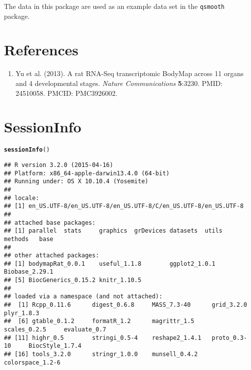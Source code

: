 \documentclass{article}\usepackage[]{graphicx}\usepackage[usenames,dvipsnames]{color}
\makeatletter
\newcommand{\hlstd}[1]{\textcolor[rgb]{0.345,0.345,0.345}{#1}}%
\newcommand{\hlkwd}[1]{\textcolor[rgb]{0.737,0.353,0.396}{\textbf{#1}}}%
\newenvironment{kframe}{%
 \def\at@end@of@kframe{}%
 \ifinner\ifhmode%
  \def\at@end@of@kframe{\end{minipage}}%
  \begin{minipage}{\columnwidth}%
 \fi\fi%
 \def\FrameCommand##1{\hskip\@totalleftmargin \hskip-\fboxsep
 \colorbox{shadecolor}{##1}\hskip-\fboxsep
     \hskip-\linewidth \hskip-\@totalleftmargin \hskip\columnwidth}%
 \MakeFramed {\advance\hsize-\width
   \@totalleftmargin\z@ \linewidth\hsize
   \@setminipage}}%
 {\par\unskip\endMakeFramed%
 \at@end@of@kframe}
\newenvironment{knitrout}{}{} %
\makeatother
\begin{document}
The data in this package are used as an example data set in the \texttt{qsmooth}
package.

\section{References}

\begin{enumerate}

\item Yu et al. (2013). A rat RNA-Seq transcriptomic BodyMap across 11 organs
and 4 developmental stages. \textit{Nature Communications} \textbf{5}:3230.
PMID: 24510058. PMCID: PMC3926002.


\end{enumerate}
\section{SessionInfo}

\begin{knitrout}
\color{fgcolor}\begin{kframe}
\begin{alltt}
\hlkwd{sessionInfo}\hlstd{()}
\end{alltt}
\begin{verbatim}
## R version 3.2.0 (2015-04-16)
## Platform: x86_64-apple-darwin13.4.0 (64-bit)
## Running under: OS X 10.10.4 (Yosemite)
## 
## locale:
## [1] en_US.UTF-8/en_US.UTF-8/en_US.UTF-8/C/en_US.UTF-8/en_US.UTF-8
## 
## attached base packages:
## [1] parallel  stats     graphics  grDevices datasets  utils     methods   base     
## 
## other attached packages:
## [1] bodymapRat_0.0.1    useful_1.1.8        ggplot2_1.0.1       Biobase_2.29.1     
## [5] BiocGenerics_0.15.2 knitr_1.10.5       
## 
## loaded via a namespace (and not attached):
##  [1] Rcpp_0.11.6      digest_0.6.8     MASS_7.3-40      grid_3.2.0       plyr_1.8.3      
##  [6] gtable_0.1.2     formatR_1.2      magrittr_1.5     scales_0.2.5     evaluate_0.7    
## [11] highr_0.5        stringi_0.5-4    reshape2_1.4.1   proto_0.3-10     BiocStyle_1.7.4 
## [16] tools_3.2.0      stringr_1.0.0    munsell_0.4.2    colorspace_1.2-6
\end{verbatim}
\end{kframe}
\end{knitrout}
\end{document}
